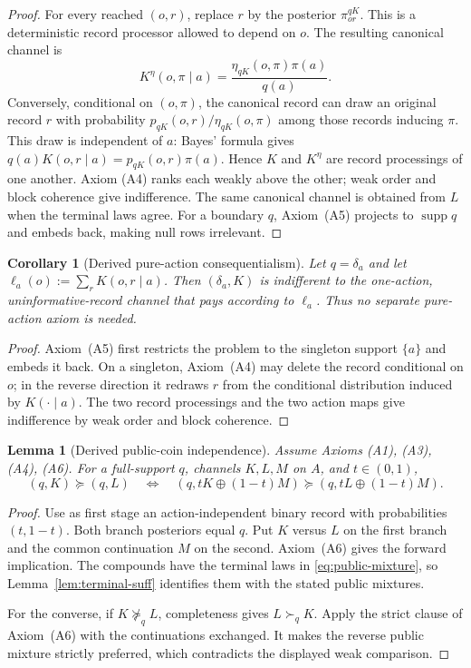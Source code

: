 \documentclass[11pt,a4paper]{article}
\newtheorem{lemma}[theorem]{Lemma}
\newtheorem{corollary}[theorem]{Corollary}
\theoremstyle{definition}
\newcommand{\supp}{\operatorname{supp}}
\newcommand{\1}{\mathbf 1}
\begin{document}
\begin{proof}
For every reached $(o,r)$, replace $r$ by the posterior $\pi^{qK}_{or}$.  This is a deterministic record processor
allowed to depend on $o$.  The resulting canonical channel is
\[
 K^{\eta}(o,\pi\mid a)
 =\frac{\eta_{qK}(o,\pi)\pi(a)}{q(a)}.
\]
Conversely, conditional on $(o,\pi)$, the canonical record can draw an original record $r$ with probability
$p_{qK}(o,r)/\eta_{qK}(o,\pi)$ among those records inducing $\pi$.  This draw is independent of $a$: Bayes' formula
gives $q(a)K(o,r\mid a)=p_{qK}(o,r)\pi(a)$.  Hence $K$ and $K^\eta$ are record processings of one another.  Axiom
\textup{(A4)} ranks each weakly above the other; weak order and block coherence give indifference.  The same canonical
channel is obtained from $L$ when the terminal laws agree.  For a boundary $q$, Axiom~\textup{(A5)} projects to
$\supp q$ and embeds back, making null rows irrelevant.
\end{proof}

\begin{corollary}[Derived pure-action consequentialism]\label{cor:pure-action}
Let $q=\delta_a$ and let $\ell_a(o):=\sum_rK(o,r\mid a)$.  Then $(\delta_a,K)$ is indifferent to the one-action,
uninformative-record channel that pays according to $\ell_a$.  Thus no separate pure-action axiom is needed.
\end{corollary}

\begin{proof}
Axiom~\textup{(A5)} first restricts the problem to the singleton support $\{a\}$ and embeds it back.  On a singleton,
Axiom~\textup{(A4)} may delete the record conditional on $o$; in the reverse direction it redraws $r$ from the
conditional distribution induced by $K(\cdot\mid a)$.  The two record processings and the two action maps give
indifference by weak order and block coherence.
\end{proof}

\begin{lemma}[Derived public-coin independence]\label{lem:public-coin}
Assume Axioms \textup{(A1), (A3), (A4), (A6)}.  For a full-support $q$, channels $K,L,M$ on $A$, and
$t\in(0,1)$,
\[
 (q,K)\succeq(q,L)
 \quad\Longleftrightarrow\quad
 (q,tK\oplus(1-t)M)\succeq(q,tL\oplus(1-t)M).
\]
\end{lemma}

\begin{proof}
Use as first stage an action-independent binary record with probabilities $(t,1-t)$.  Both branch posteriors equal
$q$.  Put $K$ versus $L$ on the first branch and the common continuation $M$ on the second.  Axiom~\textup{(A6)}
gives the forward implication.  The compounds have the terminal laws in \eqref{eq:public-mixture}, so
Lemma~\ref{lem:terminal-suff} identifies them with the stated public mixtures.

For the converse, if $K\not\succeq_qL$, completeness gives $L\succ_qK$.  Apply the strict clause of
Axiom~\textup{(A6)} with the continuations exchanged.  It makes the reverse public mixture strictly preferred, which
contradicts the displayed weak comparison.
\end{proof}
\end{document}
